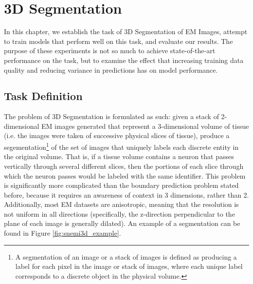 \chapter{3D Segmentation}

In this chapter, we establish the task of 3D Segmentation of EM Images, attempt to train models that perform well on this task, and evaluate our results. The purpose of these experiments is not so much to achieve state-of-the-art performance on the task, but to examine the effect that increasing training data quality and reducing variance in predictions has on model performance.

\section{Task Definition}

The problem of 3D Segmentation is formulated as such: given a stack of 2-dimensional EM images generated that represent a 3-dimensional volume of tissue (i.e. the images were taken of successive physical slices of tissue), produce a segementation\footnote{A segmentation of an image or a stack of images is defined as producing a label for each pixel in the image or stack of images, where each unique label corresponds to a discrete object in the physical volume.} of the set of images that uniquely labels each discrete entity in the original volume. That is, if a tissue volume contains a neuron that passes vertically through several different slices, then the portions of each slice through which the neuron passes would be labeled with the same identifier. This problem is significantly more complicated than the boundary prediction problem stated before, because it requires an awareness of context in 3 dimensions, rather than 2. Additionally, most EM datasets are anisotropic, meaning that the resolution is not uniform in all directions (specifically, the z-direction perpendicular to the plane of each image is generally dilated). An example of a segmentation can be found in Figure \ref{fig:snemi3d_example}.

